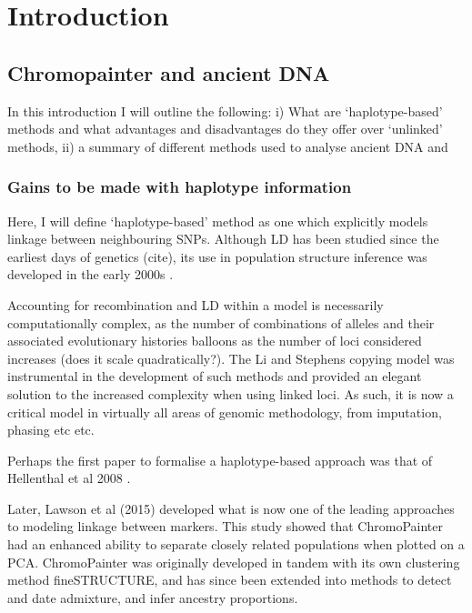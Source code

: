 \chapter{Introduction}

\section{Chromopainter and ancient DNA}

In this introduction I will outline the following: i) What are `haplotype-based' methods and what advantages and disadvantages do they offer over `unlinked' methods, ii) a summary of different methods used to analyse ancient DNA and 

\subsection{Gains to be made with haplotype information}

Here, I will define `haplotype-based' method as one which explicitly models linkage between neighbouring SNPs. Although LD has been studied since the earliest days of genetics (cite), its use in population structure inference was developed in the early 2000s \cite{conrad2006worldwide}.

Accounting for recombination and LD within a model is necessarily computationally complex, as the number of combinations of alleles and their associated evolutionary histories balloons as the number of loci considered increases (does it scale quadratically?). The Li and Stephens copying model was instrumental in the development of such methods \cite{song2016li} and provided an elegant solution to the increased complexity when using linked loci. As such, it is now a critical model in virtually all areas of genomic methodology, from imputation, phasing etc etc. 

Perhaps the first paper to formalise a haplotype-based approach was that of Hellenthal et al 2008 \cite{hellenthal2008inferring}.

Later, Lawson et al (2015) \cite{Lawson2012} developed what is now one of the leading approaches to modeling linkage between markers. This study showed that ChromoPainter had an enhanced ability to separate closely related populations when plotted on a PCA. ChromoPainter was originally developed in tandem with its own clustering method fineSTRUCTURE, and has since been extended into methods to detect and date admixture, and infer ancestry proportions. 

